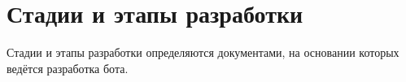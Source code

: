 \section{Стадии и этапы разработки}
\label{sec:dev}
Стадии и этапы разработки определяются документами, на основании которых ведётся разработка бота.
